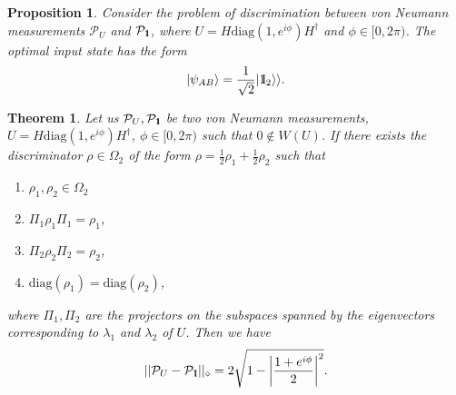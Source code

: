\documentclass[preprint,12pt, a4paper]{elsarticle}
\newcommand{\ket}[1]{\ensuremath{|#1\rangle}}
\newcommand{\1}{{\rm 1\hspace{-0.9mm}l}}
\newcommand{\Id}{{\rm 1\hspace{-0.9mm}l}}
\newcommand{\XX}{\mathcal{X}}
\newcommand{\PP}{\mathcal{P}}
\newcommand{\diag}{\mathrm{diag}}
\newtheorem{theorem}{Theorem}
\newtheorem{proposition}{Proposition}
\begin{document}
\begin{proposition}
Consider the problem of discrimination between von Neumann measurements $\PP_U$ 
and $\PP_\1$, where $U = H\diag(1, e^{i \phi}) H^\dagger $ and $\phi \in [0, 
2\pi)$.  The optimal input state has the form
\begin{equation}
\ket{\psi_{AB}} = \frac{1}{\sqrt{2}} |\Id_2 \rangle \rangle.
\end{equation}
\end{proposition}


\begin{theorem}\label{rozrpomiarow}
Let us $\mathcal{P}_U, \mathcal{P}_\1$ be two von Neumann measurements,  $U = 
H \diag(1, e^{i \phi}) H^\dagger$, $\phi \in [0, 2\pi)$ such that $0 
\not\in W(U)$.  If there exists the discriminator $\rho \in \Omega_2$ of the 
form $\rho = \frac{1}{2}\rho_1 + \frac{1}{2} \rho_2$ such that
	\begin{enumerate}
		\item $\rho_1,\rho_2 \in \Omega_2$
		\item $\Pi_1 \rho_1 \Pi_1 = \rho_1$,
		\item $\Pi_2 \rho_2 \Pi_2 = \rho_2$,
		\item  $\mathrm{diag}(\rho_1) = \mathrm{diag}(\rho_2)$,
	\end{enumerate}
	where $\Pi_1,\Pi_2 $ are the projectors on the subspaces
	spanned by the eigenvectors corresponding to $\lambda_1$ and $\lambda_2$ of 
	$U$. Then  we have 
	\begin{equation}
	||\mathcal{P}_U - \mathcal{P}_\Id||_\diamond = 2\sqrt{1- \left|\frac{1+e^{i 
	\phi}}{2}\right|^2}.
	\end{equation}
\end{theorem}
\end{document}
